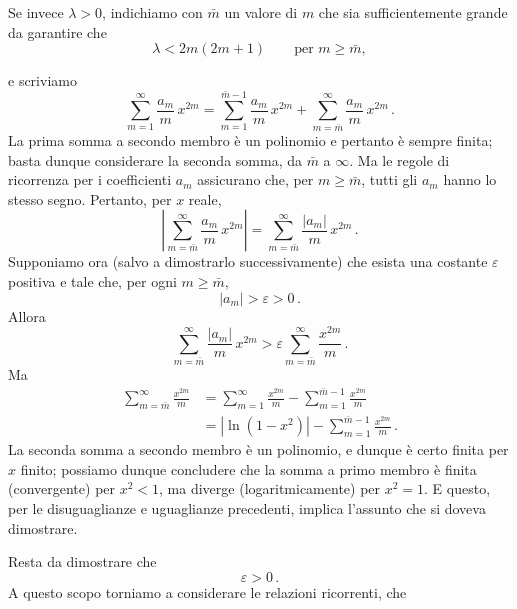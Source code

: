 \documentclass[11pt, a4paper]{book}
\numberwithin{equation}{section}
\begin{document}
Se invece $\lambda > 0$, indichiamo con $\bar{m}$ un valore di $m$
che sia sufficientemente grande da garantire che
\[
\lambda < 2m(2m+1) \qquad \text{per } m \geq \bar{m},
\]


e scriviamo
\[
\sum_{m=1}^{\infty} \frac{a_m}{m}\, x^{2m} = \sum_{m=1}^{\bar{m}-1} \frac{a_m}{m}\, x^{2m} + \sum_{m=\bar{m}}^{\infty} \frac{a_m}{m}\, x^{2m} \,.
\]
La prima somma a secondo membro è un polinomio e pertanto è
sempre finita; basta dunque considerare la seconda somma, da $\bar{m}$
a $\infty$. Ma le regole di ricorrenza per i coefficienti $a_m$ assicurano che, per $m \geq \bar{m}$, tutti gli $a_m$ hanno lo stesso segno. Pertanto, per $x$ reale,
\[
\left| \sum_{m=\bar{m}}^{\infty} \frac{a_m}{m}\, x^{2m} \right| = \sum_{m=\bar{m}}^{\infty} \frac{|a_m|}{m}\, x^{2m} \,.
\]
Supponiamo ora (salvo a dimostrarlo successivamente) che esista una
costante $\varepsilon$ positiva e tale che, per ogni $m \geq \bar{m}$,
\[
|a_m| > \varepsilon > 0 \,.
\]
Allora
\[
\sum_{m=\bar{m}}^{\infty} \frac{|a_m|}{m}\, x^{2m} > \varepsilon \sum_{m=\bar{m}}^{\infty} \frac{x^{2m}}{m} \,.
\]
Ma
\begin{align*}
\sum_{m=\bar{m}}^{\infty} \frac{x^{2m}}{m} &= \sum_{m=1}^{\infty} \frac{x^{2m}}{m} - \sum_{m=1}^{\bar{m}-1} \frac{x^{2m}}{m} \\
&= \left|\ln(1-x^2)\right| - \sum_{m=1}^{\bar{m}-1} \frac{x^{2m}}{m} \,.
\end{align*}
La seconda somma a secondo membro è un polinomio, e dunque è certo
finita per $x$ finito; possiamo dunque concludere che la somma a primo
membro è finita (convergente) per $x^2 < 1$, ma diverge (logaritmicamente)
per $x^2 = 1$. E questo, per le disuguaglianze e uguaglianze precedenti, implica l'assunto che si doveva dimostrare.

Resta da dimostrare che
\[
\varepsilon > 0 \,.
\]
A questo scopo torniamo a considerare le relazioni ricorrenti, che

\end{document}
